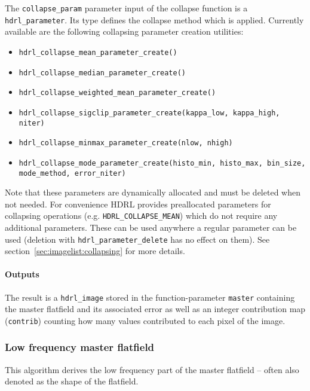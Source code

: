 The \verb+collapse_param+ parameter input of the collapse function 
is a \verb+hdrl_parameter+. Its type defines the collapse method 
which is applied. Currently available are the following collapsing
parameter creation utilities:
\begin{itemize}\itemsep-1pt \parskip0pt \small
\item \verb+hdrl_collapse_mean_parameter_create()+
\item \verb+hdrl_collapse_median_parameter_create()+
\item \verb+hdrl_collapse_weighted_mean_parameter_create()+
\item \verb+hdrl_collapse_sigclip_parameter_create(kappa_low, kappa_high, niter)+
\item \verb+hdrl_collapse_minmax_parameter_create(nlow, nhigh)+
\item \verb+hdrl_collapse_mode_parameter_create(histo_min, histo_max, bin_size,+\\\verb+mode_method, error_niter)+
\end{itemize}

Note that these parameters are dynamically allocated and must be
deleted when not needed.  For convenience HDRL provides preallocated
parameters for collapsing operations (e.g. \verb+HDRL_COLLAPSE_MEAN+)
which do not require any additional parameters. These can be used
anywhere a regular parameter can be used (deletion with
\verb+hdrl_parameter_delete+ has no effect on them). See
section~\ref{sec:imagelist:collapsing} for more details.

\paragraph{Outputs}
\label{flat:algorithms:hf:outputs}

The result is a \verb+hdrl_image+ stored in the function-parameter
\verb+master+ containing the master flatfield and its associated error
as well as an integer contribution map (\verb+contrib+) counting how
many values contributed to each pixel of the image.


\subsubsection{Low frequency master flatfield}
\label{flat:algorithms:lf}

This algorithm derives the low frequency part of the master flatfield
-- often also denoted as the shape of the flatfield.

